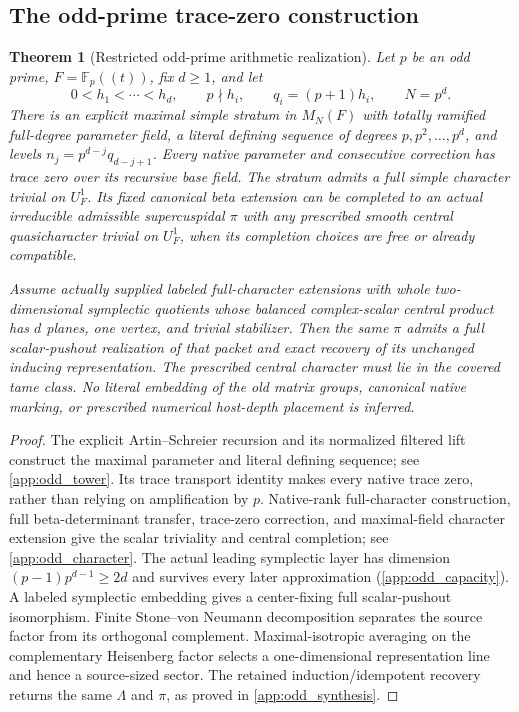 \documentclass[11pt]{amsart}
\newtheorem{theorem}{Theorem}[section]
\theoremstyle{definition}
\theoremstyle{remark}
\newcommand{\FF}{\mathbb F}
\begin{document}
\subsection{The odd-prime trace-zero construction}

\begin{theorem}[Restricted odd-prime arithmetic realization]
\label{thm:odd_arithmetic}
Let \(p\) be an odd prime, \(F=\FF_p((t))\), fix \(d\ge1\), and let
\[
0<h_1<\cdots<h_d,\qquad p\nmid h_i,
\qquad q_i=(p+1)h_i,\qquad N=p^d.
\]
There is an explicit maximal simple stratum in \(M_N(F)\) with totally
ramified full-degree parameter field, a literal defining sequence of
degrees \(p,p^2,\ldots,p^d\), and levels
\(n_j=p^{d-j}q_{d-j+1}\). Every native parameter and consecutive
correction has trace zero over its recursive base field.
The stratum admits a full simple character trivial on \(U_F^1\).
Its fixed canonical beta extension can be completed to an actual
irreducible admissible supercuspidal \(\pi\) with any prescribed smooth
central quasicharacter trivial on \(U_F^1\), when its completion choices
are free or already compatible.

Assume actually supplied labeled full-character extensions with whole
two-dimensional symplectic quotients whose balanced complex-scalar
central product has \(d\) planes, one vertex, and trivial stabilizer.
Then the same \(\pi\) admits a full scalar-pushout realization of that
packet and exact recovery of its unchanged inducing representation.
The prescribed central character must lie in the covered tame class.
No literal embedding of the old matrix groups, canonical native marking,
or prescribed numerical host-depth placement is inferred.
\end{theorem}

\begin{proof}
The explicit Artin--Schreier recursion and its normalized filtered lift
construct the maximal parameter and literal defining sequence; see
\cref{app:odd_tower}. Its trace transport identity makes every native
trace zero, rather than relying on amplification by \(p\). Native-rank
full-character construction, full beta-determinant transfer, trace-zero
correction, and maximal-field character extension give the scalar
triviality and central completion; see \cref{app:odd_character}.
The actual leading symplectic layer has dimension
\((p-1)p^{d-1}\ge2d\) and survives every later approximation
(\cref{app:odd_capacity}). A labeled symplectic embedding gives a
center-fixing full scalar-pushout isomorphism. Finite Stone--von Neumann
decomposition separates the source factor from its orthogonal
complement. Maximal-isotropic averaging on the complementary Heisenberg
factor selects a one-dimensional representation line and hence a
source-sized sector. The retained induction/idempotent recovery returns the same
\(\Lambda\) and \(\pi\), as proved in \cref{app:odd_synthesis}.
\end{proof}
\end{document}
